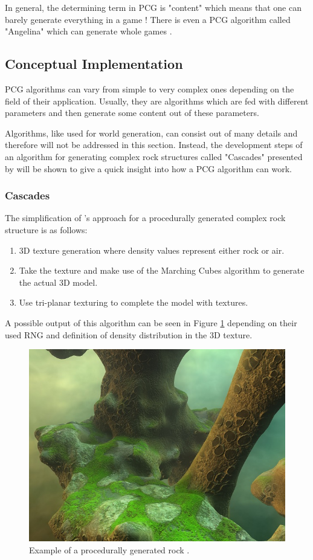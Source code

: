 \documentclass[MGS,Master,english]{twbook}%
\begin{document}
In general, the determining term in \ac{PCG} is "content" which means that one can barely generate everything in a game \cite{pcg::book}! There is even a \ac{PCG} algorithm called "Angelina" which can generate whole games \cite{pcg::angelina}.

\subsection{Conceptual Implementation}
\ac{PCG} algorithms can vary from simple to very complex ones depending on the field of their application. Usually, they are algorithms which are fed with different parameters and then generate some content out of these parameters.

Algorithms, like used for world generation, can consist out of many details and therefore will not be addressed in this section. Instead, the development steps of an algorithm for generating complex rock structures called "Cascades" presented by \citep{nvidia::cascades} will be shown to give a quick insight into how a \ac{PCG} algorithm can work.

\subsubsection{Cascades}
The simplification of 's approach for a procedurally generated complex rock structure is as follows:
\begin{enumerate}
	\item \ac{3D} texture generation where density values represent either rock or air.
	\item Take the texture and make use of the Marching Cubes algorithm to generate the actual \ac{3D} model.
	\item Use tri-planar texturing to complete the model with textures.
\end{enumerate}
A possible output of this algorithm can be seen in Figure \ref{cascadesFigure} depending on their used \ac{RNG} and definition of density distribution in the \ac{3D} texture. 
\begin{figure}[!htbp]
	\centering
	\includegraphics[width=0.5\linewidth]{PICs/cascades_small}
	\caption{Example of a procedurally generated rock \protect\cite{nvidia::cascades}.}\label{cascadesFigure}
\end{figure}
\end{document}

